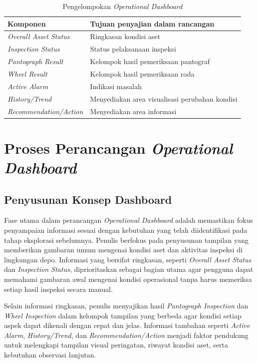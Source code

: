 \begin{table}[ht]
    \centering
    \caption{Pengelompokan \textit{Operational Dashboard}}
    \label{tab:pengelompokan-dashboard}
    \begin{tabularx}{0.9\textwidth}{|>{\raggedright\arraybackslash}X|>{\raggedright\arraybackslash}X|}
        \hline
        \textbf{Komponen} & \textbf{Tujuan penyajian dalam rancangan} \\
        \hline
        \textit{Overall Asset Status} & Ringkasan kondisi aset \\
        \hline
        \textit{Inspection Status} & Status pelaksanaan inspeksi \\
        \hline
        \textit{Pantograph Result} & Kelompok hasil pemeriksaan pantograf \\
        \hline
        \textit{Wheel Result} & Kelompok hasil pemeriksaan roda \\
        \hline
        \textit{Active Alarm} & Indikasi masalah \\
        \hline
        \textit{History/Trend} & Menyediakan area visualisasi perubahan kondisi \\
        \hline
        \textit{Recommendation/Action} & Menyediakan area informasi \\
        \hline
    \end{tabularx}
\end{table}

\section{Proses Perancangan \textit{Operational Dashboard}}
\subsection{Penyusunan Konsep Dashboard}
Fase utama dalam perancangan \textit{Operational Dashboard} adalah memastikan fokus penyampaian informasi sesuai dengan kebutuhan yang telah diidentifikasi pada tahap eksplorasi sebelumnya. Penulis berfokus pada penyusunan tampilan yang memberikan gambaran umum mengenai kondisi aset dan aktivitas inspeksi di lingkungan depo. Informasi yang bersifat ringkasan, seperti \textit{Overall Asset Status} dan \textit{Inspection Status}, diprioritaskan sebagai bagian utama agar pengguna dapat memahami gambaran awal mengenai kondisi operasional tanpa harus memeriksa setiap hasil inspeksi secara manual.

Selain informasi ringkasan, penulis menyajikan hasil \textit{Pantograph Inspection} dan \textit{Wheel Inspection} dalam kelompok tampilan yang berbeda agar kondisi setiap aspek dapat dikenali dengan cepat dan jelas. Informasi tambahan seperti \textit{Active Alarm}, \textit{History/Trend}, dan \textit{Recommendation/Action} menjadi faktor pendukung untuk melengkapi tampilan visual peringatan, riwayat kondisi aset, serta kebutuhan observasi lanjutan.

